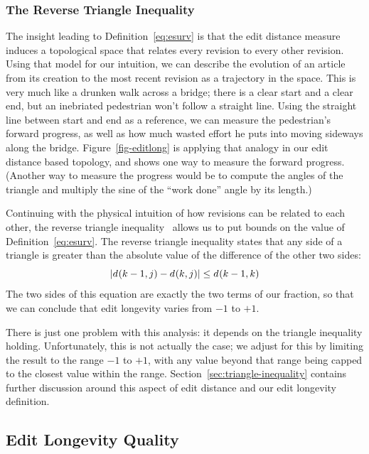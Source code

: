 \subsubsection{The Reverse Triangle Inequality}

The insight leading to Definition~\ref{eq:esurv} is that the edit distance
measure induces a topological space that relates every revision to
every other revision.
Using that model for our intuition, we can describe the evolution of
an article from its creation to the most recent revision as a trajectory
in the space.
This is very much like a drunken walk across a bridge;
there is a clear start and a clear end, but an inebriated
pedestrian won't follow a straight line.
Using the straight line between start and end as a reference,
we can measure the pedestrian's forward progress, as well as
how much wasted effort he puts into moving sideways along the bridge.
Figure~\ref{fig-editlong} is applying that analogy in our
edit distance based topology, and shows one way to measure
the forward progress.
(Another way to measure the progress would be to compute the
angles of the triangle and multiply the sine of the
``work done'' angle by its length.)

Continuing with the physical intuition of how revisions can be
related to each other, the reverse triangle
inequality~\cite{wiki:TriangleInequality} allows us to put bounds
on the value of Definition~\ref{eq:esurv}.
The reverse triangle inequality states that any side of
a triangle is greater than the absolute value of the difference
of the other two sides:
\begin{equation}
| d_{}(k-1,j) - d_{}(k,j) | \le d_{}(k-1,k)
\end{equation}
The two sides of this equation are exactly the two terms
of our fraction, so that we can conclude that edit longevity
varies from $-1$ to $+1$.

There is just one problem with this analysis: it depends on
the triangle inequality holding.
Unfortunately, this is not actually the case; we adjust for
this by limiting the result to the range $-1$ to $+1$,
with any value beyond that range being capped to the closest
value within the range.
Section~\ref{sec:triangle-inequality} contains further discussion
around this aspect of edit distance and our edit longevity
definition.

\subsection{Edit Longevity Quality}

